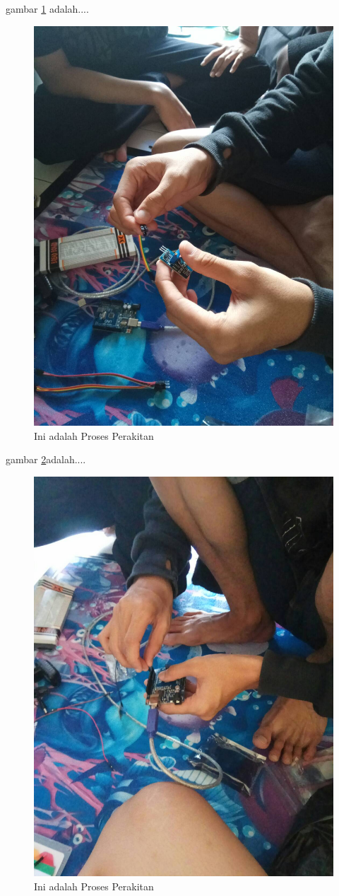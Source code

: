   gambar \ref{ar2} adalah....
  \begin{figure}[ht]
  \centerline{\includegraphics[width=.75\textwidth]{figures/ar2.jpg}}
  \caption{Ini adalah Proses Perakitan}
  \label{ar2}
  \end{figure}

  gambar \ref{ar3}adalah....
  \begin{figure}[ht]
  \centerline{\includegraphics[width=.75\textwidth]{figures/ar3.jpg}}
  \caption{Ini adalah Proses Perakitan}
  \label{ar3}
  \end{figure}

